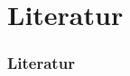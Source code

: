 \section{Literatur}
\begin{frame}[allowframebreaks]
\frametitle{Literatur}
\footnotesize{
\begin{thebibliography}{99} %

















\end{thebibliography}}
\end{frame}
